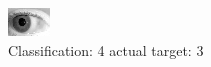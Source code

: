 \begin{figure}[h!]
\begin{center}
\includegraphics[width=0.60\columnwidth]{figures/ID329_class_4_target_3.png}
\end{center}
\caption{ Classification: 4 actual target: 3}
\label{fig:ID329_class_4_target_3}
\end{figure}
